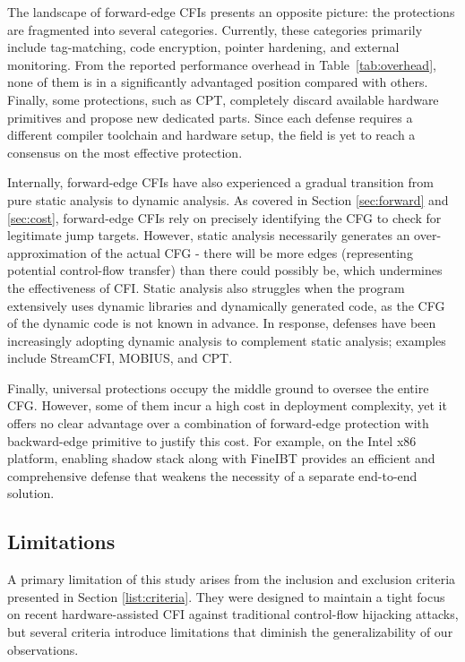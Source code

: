 \documentclass[journal,onecolumn]{IEEEtran}
\begin{document}
The landscape of forward-edge CFIs presents an opposite picture: the protections are fragmented into several categories. Currently, these categories primarily include tag-matching, code encryption, pointer hardening, and external monitoring. From the reported performance overhead in Table~\ref {tab:overhead}, none of them is in a significantly advantaged position compared with others. Finally, some protections, such as CPT\cite{Kim23}, completely discard available hardware primitives and propose new dedicated parts. Since each defense requires a different compiler toolchain and hardware setup, the field is yet to reach a consensus on the most effective protection.

Internally, forward-edge CFIs have also experienced a gradual transition from pure static analysis to dynamic analysis. As covered in Section \ref{sec:forward} and \ref{sec:cost}, forward-edge CFIs rely on precisely identifying the CFG to check for legitimate jump targets. However, static analysis necessarily generates an over-approximation of the actual CFG - there will be more edges (representing potential control-flow transfer) than there could possibly be, which undermines the effectiveness of CFI. Static analysis also struggles when the program extensively uses dynamic libraries and dynamically generated code, as the CFG of the dynamic code is not known in advance. In response, defenses have been increasingly adopting dynamic analysis to complement static analysis; examples include StreamCFI, MOBIUS, and CPT.

Finally, universal protections occupy the middle ground to oversee the entire CFG. However, some of them incur a high cost in deployment complexity, yet it offers no clear advantage over a combination of forward-edge protection with backward-edge primitive to justify this cost. For example, on the Intel x86 platform, enabling shadow stack along with FineIBT provides an efficient and comprehensive defense that weakens the necessity of a separate end-to-end solution.

\subsection{Limitations}

A primary limitation of this study arises from the inclusion and exclusion criteria presented in Section \ref{list:criteria}. They were designed to maintain a tight focus on recent hardware-assisted CFI against traditional control-flow hijacking attacks, but several criteria introduce limitations that diminish the generalizability of our observations.
\end{document}
